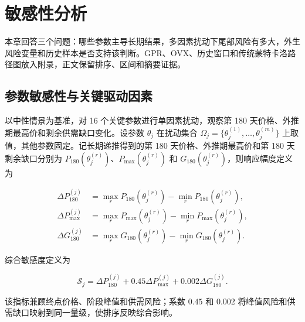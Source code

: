 \section{敏感性分析}

本章回答三个问题：哪些参数主导长期结果，多因素扰动下尾部风险有多大，外生风险变量和历史样本是否支持该判断。GPR、OVX、历史窗口和传统蒙特卡洛路径图放入附录，正文保留排序、区间和摘要证据。

\subsection{参数敏感性与关键驱动因素}

以中性情景为基准，对 16 个关键参数进行单因素扰动，观察第 180 天价格、外推期最高价和剩余供需缺口变化。设参数 \(\theta_j\) 在扰动集合 \(\Omega_j=\{\theta_j^{(1)},\ldots,\theta_j^{(m)}\}\) 上取值，其他参数固定。记长期递推得到的第 180 天价格、外推期最高价和第 180 天剩余缺口分别为 \(P_{180}(\theta_j^{(r)})\)、\(P_{\max}(\theta_j^{(r)})\) 和 \(G_{180}(\theta_j^{(r)})\)，则响应幅度定义为

\begin{equation}
\begin{aligned}
  \Delta P_{180}^{(j)}&=\max_{r}P_{180}(\theta_j^{(r)})-\min_{r}P_{180}(\theta_j^{(r)}),\\
  \Delta P_{\max}^{(j)}&=\max_{r}P_{\max}(\theta_j^{(r)})-\min_{r}P_{\max}(\theta_j^{(r)}),\\
  \Delta G_{180}^{(j)}&=\max_{r}G_{180}(\theta_j^{(r)})-\min_{r}G_{180}(\theta_j^{(r)}).
\end{aligned}
\end{equation}

综合敏感度定义为

\begin{equation}
  \mathcal S_j
  =
  \Delta P_{180}^{(j)}
  +0.45\Delta P_{\max}^{(j)}
  +0.002\Delta G_{180}^{(j)}.
\end{equation}

该指标兼顾终点价格、阶段峰值和供需风险；系数 \(0.45\) 和 \(0.002\) 将峰值风险和供需缺口映射到同一量级，使排序反映综合影响。

